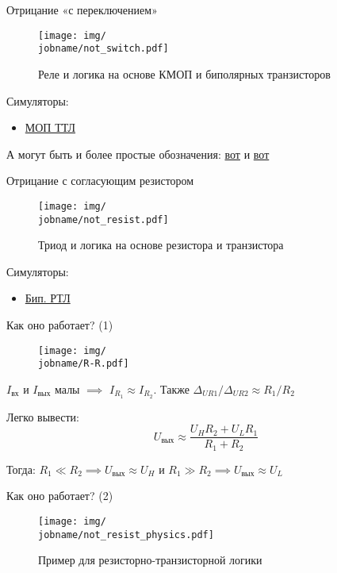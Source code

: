 \documentclass[xetex,aspectratio=43]{beamer}
\begin{document}
\begin{frame}{Отрицание «с переключением»}
    \begin{figure}
        \texttt{[image: img/\\jobname/not\_switch.pdf]}
        \caption{Реле и логика на основе КМОП и биполярных транзисторов}
    \end{figure}
    Симуляторы:
    \begin{itemize}
        \item \href{https://www.falstad.com/circuit/e-cmosinverter.html}{МОП ТТЛ}
    \end{itemize}
    \pause
    А могут быть и более простые обозначения: \href{https://en.wikipedia.org/wiki/CMOS}{вот} и \href{https://github.com/dluciv/Computer_Architecture-SPbU-CB.5080/tree/main/circuits}{вот}
\end{frame}

\begin{frame}{Отрицание с согласующим резистором}
    \begin{figure}
        \texttt{[image: img/\\jobname/not\_resist.pdf]}
        \caption{Триод и логика на основе резистора и транзистора}
    \end{figure}
    Симуляторы:
    \begin{itemize}
        \item \href{https://www.falstad.com/circuit/e-rtlinverter.html}{Бип. РТЛ}
    \end{itemize}
\end{frame}

\begin{frame}{Как оно работает? (1)}
    \begin{figure}
        \texttt{[image: img/\\jobname/R-R.pdf]}
    \end{figure}

\(I_\text{вх}\) и \(I_\text{вых}\) малы \(\implies\) \(I_{R_1} \approx I_{R_2}\).
Также \(\Delta_{U R1} / \Delta_{U R2} \approx R_1 / R_2\)

Легко вывести:
\[U_\text{вых} \approx \frac{U_H R_2 + U_L R_1}{R_1 + R_2}\]

Тогда: \(R_1 \ll R_2 \implies U_\text{вых} \approx U_H\) и \(R_1 \gg R_2 \implies U_\text{вых} \approx U_L\)
\end{frame}

\begin{frame}{Как оно работает? (2)}
    \begin{figure}
    \texttt{[image: img/\\jobname/not\_resist\_physics.pdf]}
    \caption{Пример для резисторно-транзисторной логики}
    \end{figure}
\end{frame}
\end{document}
